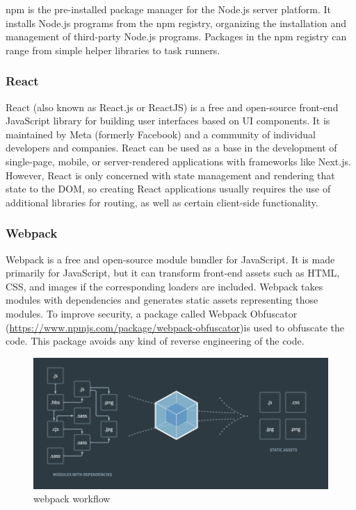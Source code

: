 npm is the pre-installed package manager for the Node.js server platform. It installs Node.js programs from the npm registry, organizing the installation and management of third-party Node.js programs. Packages in the npm registry can range from simple helper libraries to task runners.

\subsubsection {React}

React (also known as React.js or ReactJS) is a free and open-source front-end JavaScript library for building user interfaces based on UI components. It is maintained by Meta (formerly Facebook) and a community of individual developers and companies. React can be used as a base in the development of single-page, mobile, or server-rendered applications with frameworks like Next.js. However, React is only concerned with state management and rendering that state to the DOM, so creating React applications usually requires the use of additional libraries for routing, as well as certain client-side functionality.

\subsubsection {Webpack}

Webpack is a free and open-source module bundler for JavaScript. It is made primarily for JavaScript, but it can transform front-end assets such as HTML, CSS, and images if the corresponding loaders are included. Webpack takes modules with dependencies and generates static assets representing those modules.
To improve security, a package called Webpack Obfuscator (\url{https://www.npmjs.com/package/webpack-obfuscator})is used to obfuscate the code. This package avoids any kind of reverse engineering of the code.
\begin{figure}[h!]
    \vspace{0.5cm}
    \includegraphics[width=\textwidth]{images/extension/webpack-bundle.png}
    \caption{webpack workflow}
    \label{fig:webpack-bundle} %
\end{figure}

